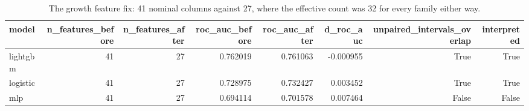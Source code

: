\begin{table}
\caption{The growth feature fix: 41 nominal columns against 27, where the effective count was 32 for every family either way.}
\label{tab:19_growth_fix}
\begin{tabular}{lrrrrrrr}
\toprule
model & n_features_before & n_features_after & roc_auc_before & roc_auc_after & d_roc_auc & unpaired_intervals_overlap & interpreted \\
\midrule
lightgbm & 41 & 27 & 0.762019 & 0.761063 & -0.000955 & True & True \\
logistic & 41 & 27 & 0.728975 & 0.732427 & 0.003452 & True & True \\
mlp & 41 & 27 & 0.694114 & 0.701578 & 0.007464 & False & False \\
\bottomrule
\end{tabular}
\end{table}
